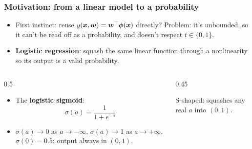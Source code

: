 \documentclass[10pt]{beamer}
\begin{document}
\begin{frame}[fragile]
\frametitle{Motivation: from a linear model to a probability}

\begin{itemize}
\item First instinct: reuse $y(\boldsymbol{x},\boldsymbol{w}) = \boldsymbol{w}^\top\boldsymbol\phi(\boldsymbol{x})$
  directly? Problem: it's unbounded, so it can't be read off as a
  probability, and doesn't respect $t\in\{0,1\}$.
\item[$\Rightarrow$] \textbf{Logistic regression}: squash the same linear
  function through a nonlinearity so its output is a valid probability.
\end{itemize}

\vspace{4pt}
\begin{columns}[T]
\begin{column}{0.5\textwidth}
\begin{itemize}
\item The \textbf{logistic sigmoid}:
\[
\sigma(a) = \frac{1}{1+e^{-a}}
\]
\item $\sigma(a) \to 0$ as $a\to-\infty$, $\sigma(a)\to1$ as
  $a\to+\infty$, $\sigma(0)=0.5$: output always in $(0,1)$.
\end{itemize}
\end{column}
\begin{column}{0.45\textwidth}

\vspace{2pt}
{\scriptsize S-shaped: squashes any real $a$ into $(0,1)$.}
\end{column}
\end{columns}

\end{frame}
\end{document}
